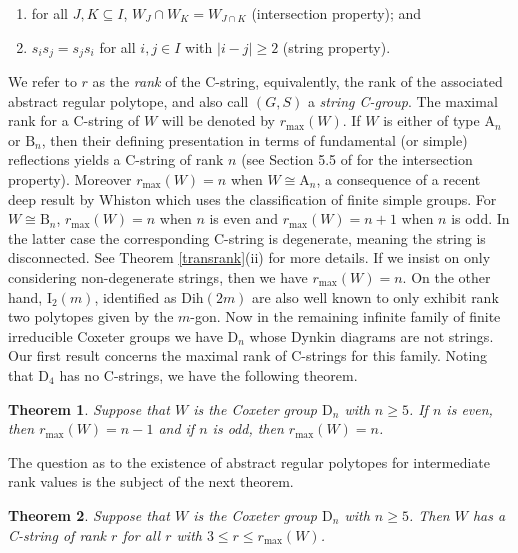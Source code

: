 \documentclass{amsart}
\numberwithin{equation}{section}
\theoremstyle{plain} %
\newtheorem{theorem}{Theorem}[section]
\begin{document}
\begin{enumerate}
\item[(i)] for all $J, K \subseteq I$, $W_J \cap W_K = W_{J \cap K}$  (intersection property); and
\item[(ii)] $s_is_j = s_js_i$ for all $i, j \in I$ with $|i - j| \geq 2$ (string property).
\end{enumerate}

We refer to $r$ as the \emph{rank} of the C-string, equivalently, the rank of the associated abstract regular polytope, and also call $(G,S)$ a \emph{string C-group}. The maximal rank for a C-string of $W$ will be denoted by $r_{\mathrm{max}}(W)$. If $W$ is either of type $\mathrm{A}_n$ or $\mathrm{B}_n$, then their defining presentation in terms of fundamental (or simple) reflections yields a C-string of rank $n$ (see Section 5.5 of \cite{coxbible} for the intersection property).  Moreover $r_{\mathrm{max}}(W) = n$  when $W \cong \mathrm{A}_n$, a consequence of a recent deep result by Whiston \cite{whiston} which uses the classification of finite simple groups.  For $W \cong \mathrm{B}_n$, $r_{\mathrm{max}}(W) = n$ when $n$ is even and $r_{\mathrm{max}}(W) = n + 1$ when $n$ is odd. In the latter case the corresponding C-string is degenerate, meaning the string is disconnected.  See Theorem \ref{transrank}(ii) for more details. If we insist on only considering non-degenerate strings, then we have 
$r_{\mathrm{max}}(W) = n$.  On the other hand, $\mathrm{I}_2(m)$, identified as $\mathrm{Dih}(2m)$ are also well known to only exhibit rank two polytopes given by the $m$-gon. Now in the remaining infinite family of finite irreducible Coxeter groups we have $\mathrm{D}_n$ whose Dynkin diagrams are not strings. Our first result concerns the maximal rank of C-strings for this family.  Noting that $\mathrm{D}_4$ has no C-strings, we have the following theorem.  

\begin{theorem}\label{maximalrank}
Suppose that $W$ is the Coxeter group $\mathrm{D}_n$ with $n \geq 5$. If $n$ is even, then $r_{\mathrm{max}}(W) = n - 1$ and if $n$ is odd, then $r_{\mathrm{max}}(W) = n$.
\end{theorem}

The question as to the existence of abstract regular polytopes for intermediate rank values is the subject of the next theorem.

\begin{theorem}\label{intermediateranks} Suppose that $W$ is the Coxeter group $\mathrm{D}_n$ with $n \geq 5$.  Then $W$ has a C-string of rank $r$ for all $r$ with $3 \leq r \leq r_{\mathrm{max}}(W)$.

\end{theorem}
\end{document}
